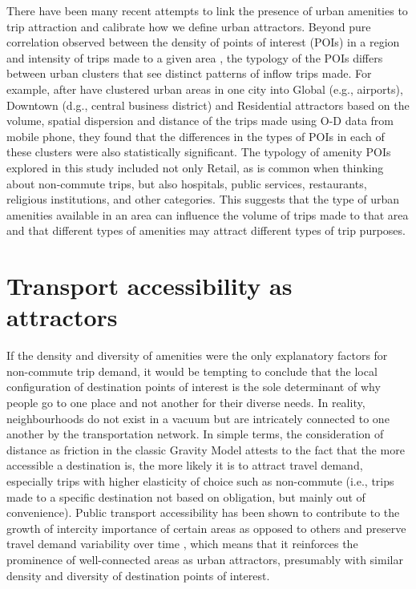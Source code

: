 There have been many recent attempts to link the presence of urban amenities to trip attraction and calibrate how we define urban attractors. Beyond pure correlation observed between the density of points of interest (POIs) in a region and intensity of trips made to a given area \citep{melikovCharacterizingUrbanMobility2021}, the typology of the POIs differs between urban clusters that see distinct patterns of inflow trips made. For example, after \citet{aaqibjavedEstimationTripAttraction2020} have clustered urban areas in one city into Global (e.g., airports), Downtown (d.g., central business district) and Residential attractors based on the volume, spatial dispersion and distance of the trips made using O-D data from mobile phone, they found that the differences in the types of POIs in each of these clusters were also statistically significant. The typology of amenity POIs explored in this study included not only Retail, as is common when thinking about non-commute trips, but also hospitals, public services, restaurants, religious institutions, and other categories. This suggests that the type of urban amenities available in an area can influence the volume of trips made to that area and that different types of amenities may attract different types of trip purposes.

\section{Transport accessibility as attractors}

If the density and diversity of amenities were the only explanatory factors for non-commute trip demand, it would be tempting to conclude that the local configuration of destination points of interest is the sole determinant of why people go to one place and not another for their diverse needs. In reality, neighbourhoods do not exist in a vacuum but are intricately connected to one another by the transportation network. In simple terms, the consideration of distance as friction in the classic Gravity Model attests to the fact that the more accessible a destination is, the more likely it is to attract travel demand, especially trips with higher elasticity of choice such as non-commute (i.e., trips made to a specific destination not based on obligation, but mainly out of convenience). 
Public transport accessibility has been shown to contribute to the growth of intercity importance of certain areas as opposed to others and preserve travel demand variability over time \citep{zhongMeasuringVariabilityMobility2015}, which means that it reinforces the prominence of well-connected areas as urban attractors, presumably with similar density and diversity of destination points of interest. 

